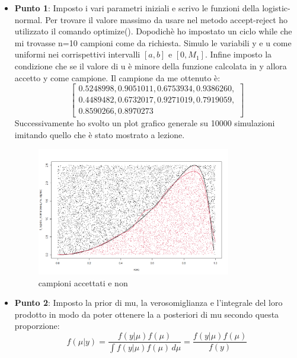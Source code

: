 \documentclass[a4paper,12pt]{article}
\begin{document}
\begin{itemize}
	\item \textbf{Punto 1}: Imposto i vari parametri iniziali e scrivo le funzioni della logistic-normal. Per trovare il valore massimo da usare nel metodo accept-reject ho utilizzato il comando optimize(). Dopodichè ho impostato un ciclo while che mi trovasse n=10 campioni come da richiesta. Simulo le variabili y e u come uniformi nei corrispettivi intervalli $[a,b] $ e $[0,M_1]$. Infine imposto la condizione che se il valore di u è minore della funzione calcolata in y allora accetto y come campione. Il campione da me ottenuto è:\\
	\[
	\left[
	\begin{array}{l}
		0.5248998, 0.9051011, 0.6753934, 0.9386260, \\
		0.4489482, 0.6732017, 0.9271019, 0.7919059, \\
		0.8590266, 0.8970273
	\end{array}
	\right]
	\]
	Successivamente ho svolto un plot grafico generale su 10000 simulazioni imitando quello che è stato mostrato a lezione.
	\begin{figure}[h] %
		\centering %
		\includegraphics[width=0.8\textwidth]{lognorm.png} %
		\caption{campioni accettati e non} %
		\label{fig:immagine} %
	\end{figure}
	\newpage
	\item \textbf{Punto 2}: Imposto la prior di mu, la verosomiglianza e l'integrale del loro prodotto in modo da poter ottenere la a posteriori di mu secondo questa proporzione:
	\[
	f(\mu | y) = \frac{f(y | \mu) f(\mu)}{\int f(y | \mu) f(\mu) \, d\mu} = \frac{f(y | \mu) f(\mu)}{f(y)}
	\]

\end{itemize}
\end{document}
